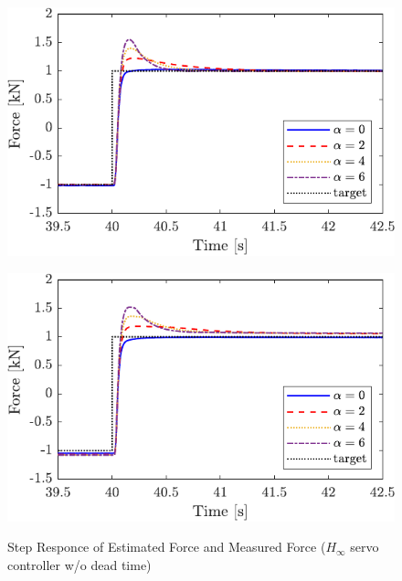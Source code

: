\begin{figure}[t]
    \begin{minipage}{\minipageratio\hsize}
    \centering
        \includegraphics[keepaspectratio, width = \minifigwidth]{contents/ForceControl/figure/1115/crop-1115_JFPSHinf_estforce_step.pdf}
        \label{fig4:crop-1115_JFPSHinf_estforce_step}
    \end{minipage}
    \begin{minipage}{\minipageratio\hsize}
    \centering
        \includegraphics[keepaspectratio, width = \minifigwidth]{contents/ForceControl/figure/1115/crop-1115_JFPSHinf_force_step.pdf}
        \label{fig4:crop-1115_JFPSHinf_force_step}
    \end{minipage}
    \caption{Step Responce of Estimated Force and Measured Force ($H_\infty$ servo controller w/o dead time)}   
    \label{fig4:crop-1115_JFPSHinf_step}
\end{figure}
